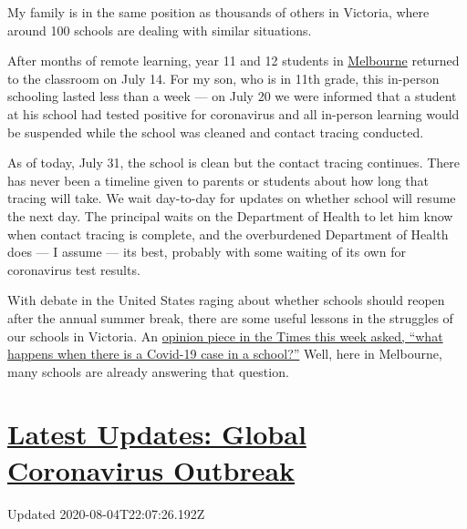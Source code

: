 My family is in the same position as thousands of others in Victoria,
where around 100 schools are dealing with similar situations.

After months of remote learning, year 11 and 12 students in
\href{https://www.nytimes3xbfgragh.onion/2020/08/04/world/australia/coronavirus-melbourne-lockdown.html}{Melbourne}
returned to the classroom on July 14. For my son, who is in 11th grade,
this in-person schooling lasted less than a week --- on July 20 we were
informed that a student at his school had tested positive for
coronavirus and all in-person learning would be suspended while the
school was cleaned and contact tracing conducted.

As of today, July 31, the school is clean but the contact tracing
continues. There has never been a timeline given to parents or students
about how long that tracing will take. We wait day-to-day for updates on
whether school will resume the next day. The principal waits on the
Department of Health to let him know when contact tracing is complete,
and the overburdened Department of Health does --- I assume --- its
best, probably with some waiting of its own for coronavirus test
results.

With debate in the United States raging about whether schools should
reopen after the annual summer break, there are some useful lessons in
the struggles of our schools in Victoria. An
\href{https://www.nytimes3xbfgragh.onion/2020/07/28/opinion/coronavirus-schools-reopening.html?searchResultPosition=2}{opinion
piece in the Times this week asked, ``what happens when there is a
Covid-19 case in a school?''} Well, here in Melbourne, many schools are
already answering that question.

\hypertarget{latest-updates-global-coronavirus-outbreak}{%
\section{\texorpdfstring{\href{https://www.nytimes3xbfgragh.onion/2020/08/04/world/coronavirus-cases.html?action=click\&pgtype=Article\&state=default\&region=MAIN_CONTENT_1\&context=storylines_live_updates}{Latest
Updates: Global Coronavirus
Outbreak}}{Latest Updates: Global Coronavirus Outbreak}}\label{latest-updates-global-coronavirus-outbreak}}

Updated 2020-08-04T22:07:26.192Z

